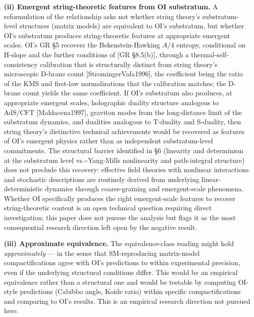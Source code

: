 \documentclass[
]{article}
\begin{document}
\textbf{(ii) Emergent string-theoretic features from OI substratum.} A
reformulation of the relationship asks not whether string theory's
substratum-level structures (matrix models) are equivalent to OI's
substratum, but whether OI's substratum produces string-theoretic
features at appropriate emergent scales. OI's GR §5 recovers the
Bekenstein-Hawking \(A/4\) entropy, conditional on H-slope and the
further conditions of {[}GR §8.5(b){]}, through a
thermal-self-consistency calibration that is structurally distinct from
string theory's microscopic D-brane count {[}StromingerVafa1996{]}, the
coefficient being the ratio of the KMS and first-law normalizations that
the calibration matches; the D-brane count yields the same coefficient.
If OI's substratum also produces, at appropriate emergent scales,
holographic duality structure analogous to AdS/CFT {[}Maldacena1997{]},
graviton modes from the long-distance limit of the substratum dynamics,
and dualities analogous to T-duality and S-duality, then string theory's
distinctive technical achievements would be recovered as features of
OI's emergent physics rather than as independent substratum-level
commitments. The structural barrier identified in §6 (linearity and
determinism at the substratum level vs.\textasciitilde Yang-Mills
nonlinearity and path-integral structure) does not preclude this
recovery: effective field theories with nonlinear interactions and
stochastic descriptions are routinely derived from underlying
linear-deterministic dynamics through coarse-graining and emergent-scale
phenomena. Whether OI specifically produces the right emergent-scale
features to recover string-theoretic content is an open technical
question requiring direct investigation; this paper does not pursue the
analysis but flags it as the most consequential research direction left
open by the negative result.

\textbf{(iii) Approximate equivalence.} The equivalence-class reading
might hold \emph{approximately} --- in the sense that SM-reproducing
matrix-model compactifications agree with OI's predictions to within
experimental precision, even if the underlying structural conditions
differ. This would be an empirical equivalence rather than a structural
one and would be testable by computing OI-style predictions (Cabibbo
angle, Koide ratio) within specific compactifications and comparing to
OI's results. This is an empirical research direction not pursued here.
\end{document}
